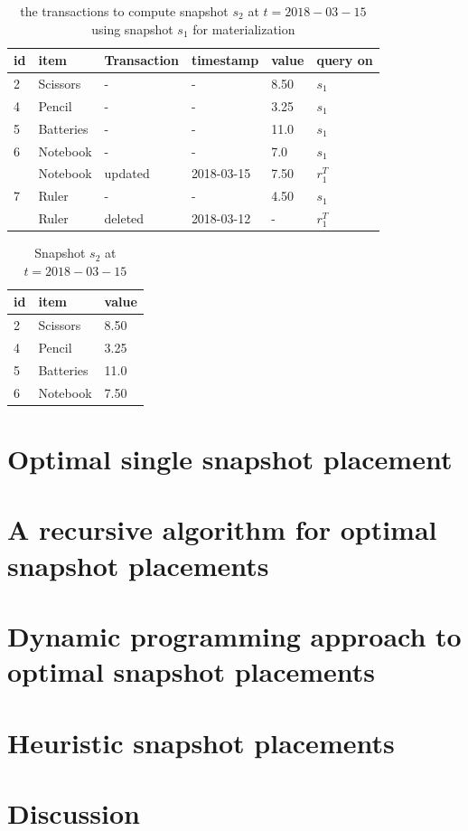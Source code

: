 \begin{center}
\begin{table}
	\centering
	\caption{the transactions to compute snapshot $s_2$ at $t = 2018-03-15$ using snapshot $s_1$ for materialization}
	\label{table:transactions_materialized}
	\begin{tabular}{p{1cm}p{2cm}p{2cm}p{3cm}p{2cm}p{2cm}}
		\hline
		id & item & Transaction  &timestamp & value  &query on\\ \hline
		2 & Scissors & - & - & 8.50 & $s_1$ \\ \hline
	  	4 & Pencil & - & - & 3.25 & $s_1$ \\ \hline
  	  	5 & Batteries & - & - & 11.0 & $s_1$ \\ \hline
		6 & Notebook & - & - & 7.0 & $s_1$ \\ 
		  & Notebook & updated & 2018-03-15 & 7.50 & $r_1^T$ \\ \hline
		7 & Ruler & - & - & 4.50 & $s_1$ \\
		  & Ruler & deleted & 2018-03-12 & - & $r_1^T$ \\ \hline
	\end{tabular}
\end{table}
\end{center}

\begin{center}
\begin{table}
	\centering
	\caption{Snapshot $s_2$ at $t = 2018-03-15$}
	\label{table:snapshot_s2}
	\begin{tabular}{p{4cm}p{4cm}p{4cm}}
		\hline
		id & item  & value  \\ \hline
		2 & Scissors & 8.50   \\ 
		4 & Pencil & 3.25   \\ 
		5 & Batteries & 11.0   \\ 
		6 & Notebook & 7.50 \\ \hline
	\end{tabular}
\end{table}
\end{center}

\section{Optimal single snapshot placement}

\section{A recursive algorithm for optimal snapshot placements}

\section{Dynamic programming approach to optimal snapshot placements}

\section{Heuristic snapshot placements}

\section{Discussion}
